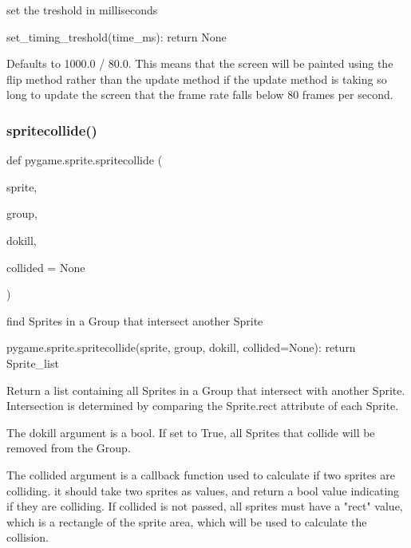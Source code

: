 \begin{DoxyVerb}set the treshold in milliseconds

set_timing_treshold(time_ms): return None

Defaults to 1000.0 / 80.0. This means that the screen will be painted
using the flip method rather than the update method if the update
method is taking so long to update the screen that the frame rate falls
below 80 frames per second.\end{DoxyVerb}
 \mbox{\label{namespacepygame_1_1sprite_aa68d7d247355b00f22e3dc6b84b92dfb}} 
\subsubsection{\texorpdfstring{spritecollide()}{spritecollide()}}
{\footnotesize\ttfamily def pygame.\+sprite.\+spritecollide (\begin{DoxyParamCaption}\item[{}]{sprite,  }\item[{}]{group,  }\item[{}]{dokill,  }\item[{}]{collided = {\ttfamily None} }\end{DoxyParamCaption})}

\begin{DoxyVerb}find Sprites in a Group that intersect another Sprite

pygame.sprite.spritecollide(sprite, group, dokill, collided=None):
    return Sprite_list

Return a list containing all Sprites in a Group that intersect with another
Sprite. Intersection is determined by comparing the Sprite.rect attribute
of each Sprite.

The dokill argument is a bool. If set to True, all Sprites that collide
will be removed from the Group.

The collided argument is a callback function used to calculate if two
sprites are colliding. it should take two sprites as values, and return a
bool value indicating if they are colliding. If collided is not passed, all
sprites must have a "rect" value, which is a rectangle of the sprite area,
which will be used to calculate the collision.\end{DoxyVerb}
 \mbox{\label{namespacepygame_1_1sprite_a25941b8c21cff8ba445e32266ba1282d}} 
